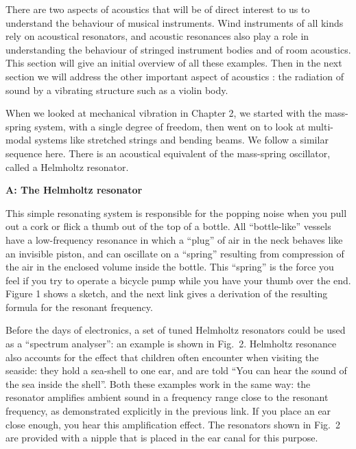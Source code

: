 

  There are two aspects of acoustics that will be of direct interest to us to 
  understand the behaviour of musical instruments. Wind instruments of all 
  kinds rely on acoustical resonators, and acoustic resonances also play a role 
  in understanding the behaviour of stringed instrument bodies and of room 
  acoustics. This section will give an initial overview of all these examples. 
  Then in the next section we will address the other important aspect of 
  acoustics : the radiation of sound by a vibrating structure such as a violin 
  body. 

  When we looked at mechanical vibration in Chapter 2, we started with the 
  mass-spring system, with a single degree of freedom, then went on to look at 
  multi-modal systems like stretched strings and bending beams. We follow a 
  similar sequence here. There is an acoustical equivalent of the mass-spring 
  oscillator, called a Helmholtz resonator. 

  \textbf{A: The Helmholtz resonator} 

  This simple resonating system is responsible for the popping noise when you 
  pull out a cork or flick a thumb out of the top of a bottle. All 
  “bottle-like” vessels have a low-frequency resonance in which a “plug” of air 
  in the neck behaves like an invisible piston, and can oscillate on a “spring” 
  resulting from compression of the air in the enclosed volume inside the 
  bottle. This ``spring'' is the force you feel if you try to operate a bicycle 
  pump while you have your thumb over the end. Figure 1 shows a sketch, and the 
  next link gives a derivation of the resulting formula for the resonant 
  frequency. 


  Before the days of electronics, a set of tuned Helmholtz resonators could be 
  used as a “spectrum analyser”: an example is shown in Fig.\ 2. Helmholtz 
  resonance also accounts for the effect that children often encounter when 
  visiting the seaside: they hold a sea-shell to one ear, and are told ``You 
  can hear the sound of the sea inside the shell''. Both these examples work in 
  the same way: the resonator amplifies ambient sound in a frequency range 
  close to the resonant frequency, as demonstrated explicitly in the previous 
  link. If you place an ear close enough, you hear this amplification effect. 
  The resonators shown in Fig.\ 2 are provided with a nipple that is placed in 
  the ear canal for this purpose. 

